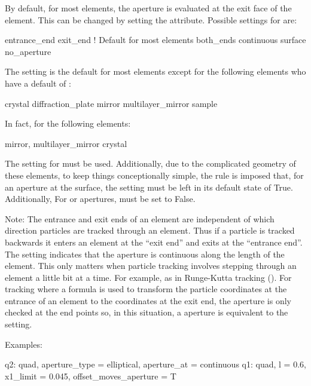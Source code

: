 By default, for most elements, the aperture is evaluated at the exit face of the
element. This can be changed by setting the  attribute.
Possible settings for  are:
\begin{example}
  entrance_end
  exit_end       ! Default for most elements
  both_ends
  continuous
  surface  
  no_aperture
\end{example}
The  setting is the default for most elements except for
the following elements who have a default of :
\begin{example}
  crystal
  diffraction_plate
  mirror
  multilayer_mirror
  sample
\end{example}

In fact, for the following elements:
\begin{example}
  mirror, 
  multilayer_mirror
  crystal
\end{example}
The  setting for  must be used.
Additionally, due to the complicated geometry of these elements, to
keep things conceptionally simple, the rule is imposed that, for an
aperture at the surface, the  setting must
be left in its default state of True. Additionally, For
 or  apertures,
 must be set to False.

Note: The entrance and exit ends of an element are independent of
which direction particles are tracked through an element. Thus if a
particle is tracked backwards it enters an element at the ``exit end''
and exits at the ``entrance end''. The  setting
indicates that the aperture is continuous along the length of the
element. This only matters when particle tracking involves stepping
through an element a little bit at a time. For example, as in
Runge-Kutta tracking (). For tracking where a formula is
used to transform the particle coordinates at the entrance of an
element to the coordinates at the exit end, the aperture is only
checked at the end points so, in this situation, a 
aperture is equivalent to the  setting.

Examples:
\begin{example}
  q2: quad, aperture_type = elliptical, aperture_at = continuous
  q1: quad, l = 0.6, x1_limit = 0.045, offset_moves_aperture = T
\end{example}

